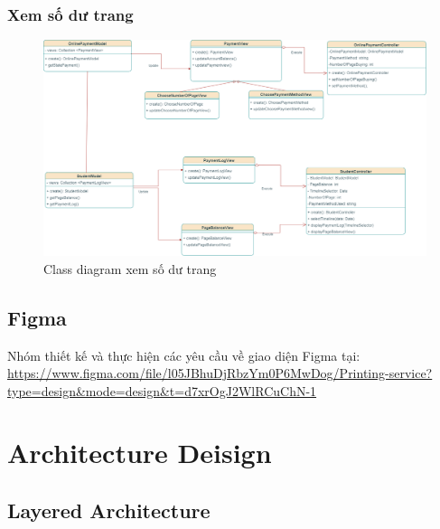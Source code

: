 \documentclass[a4paper]{article}
\begin{document}
\subsubsection{Xem số dư trang}
\begin{figure}[h!]
\begin{center}
\includegraphics[width=16cm]{picture/view+buy printing page - class diagram.drawio.png}
\caption{Class diagram xem số dư trang}
\end{center}
\end{figure}
\subsection{Figma}
\noindent Nhóm thiết kế và thực hiện các yêu cầu về giao diện Figma tại: \url{https://www.figma.com/file/l05JBhuDjRbzYm0P6MwDog/Printing-service?type=design&mode=design&t=d7xrOgJ2WlRCuChN-1}
\clearpage
\section{Architecture Deisign}
\subsection{Layered Architecture}
\end{document}
